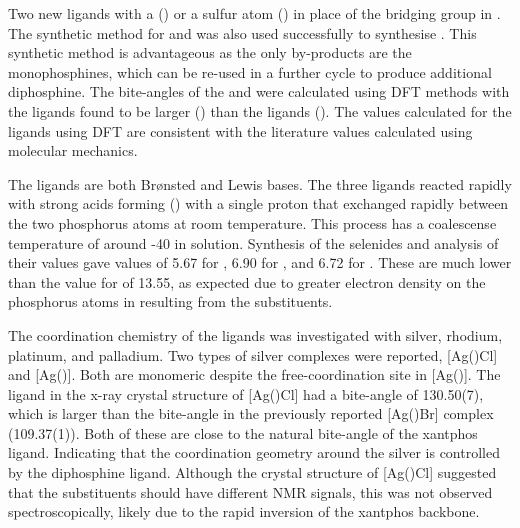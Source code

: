 Two new \tBuxantphos{} ligands with a  (\tBusixantphos) or a sulfur atom (\tButhixantphos) in place of the  bridging group in \tBuxantphos.  The synthetic method for \tBusixantphos{} and \tButhixantphos{} was also used successfully to synthesise \tBuxantphos{}.  This synthetic method is advantageous as the only by-products are the monophosphines, which can be re-used in a further cycle to produce additional diphosphine.  The bite-angles of the \tBuxantphos{} and \Phxantphos{} were calculated using \gls{DFT} methods with the \tBuxantphos{} ligands found to be larger () than the \Phxantphos{} ligands ().  The values calculated for the \Phxantphos{} ligands using DFT are consistent with the literature values calculated using molecular mechanics.  

The \tBuxantphos{} ligands are both Br\o nsted and Lewis bases.  The three ligands reacted rapidly with strong acids forming (\tBuxantphos) with a single proton that exchanged rapidly between the two phosphorus atoms at room temperature.  This process has a coalescense temperature of around -40 \degC{} in solution.  Synthesis of the \tBuxantphos{} selenides and analysis of their \JPSe{} values gave \pKb{} values of 5.67 for \tBusixantphos, 6.90 for \tButhixantphos{}, and 6.72 for \tBuxantphos{}.  These are much lower than the value for \Phxantphos{} of 13.55, as expected due to greater electron density on the phosphorus atoms in \tBuxantphos{} resulting from the \tBu{} substituents.  

The coordination chemistry of the \tBuxantphos{} ligands was investigated with silver, rhodium, platinum, and palladium.  Two types of silver complexes were reported, [Ag(\tBuxantphos)Cl] and [Ag(\tBuxantphos)].  Both are monomeric despite the free-coordination site in [Ag(\tBuxantphos)].  The \tButhixantphos{} ligand in the x-ray crystal structure of [Ag(\tButhixantphos)Cl] had a bite-angle of 130.50(7)\degrees{}, which is larger than the bite-angle in the previously reported [Ag(\Phxantphos)Br] complex (109.37(1)\degrees{}).  Both of these are close to the natural bite-angle of the xantphos ligand.  Indicating that the coordination geometry around the silver is controlled by the diphosphine ligand.  Although the crystal structure of [Ag(\tButhixantphos)Cl] suggested that the \tBu{} substituents should have different NMR signals, this was not observed spectroscopically, likely due to the rapid inversion of the xantphos backbone.  

